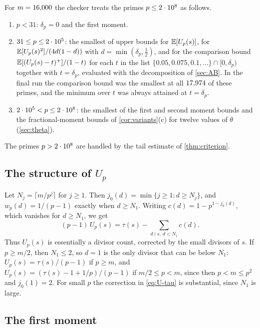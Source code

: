 For $m=16{,}000$ the checker  treats the primes $p\le2\cdot 10^{8}$ as follows.
\begin{enumerate}[label=(\alph*$'$)]
\item $p<31$: $\delta_p=0$ and the first moment.
\item $31\le p\le2\cdot 10^{5}$: the smallest of upper bounds for $\mathbb{E}[U_p(s)]$, for $\mathbb{E}[U_p(s)^2]/(4d(1-d))$ with
  $d=\min(\delta_p,\frac12)$, and for the comparison bound $\mathbb{E}[(U_p(s)-t)^+]/(1-t)$ for each $t$ in the list
  $\{0.05,0.075,0.1,\dots\}\cap[0,\delta_p)$ together with $t=\delta_p$, evaluated with the decomposition of
  \cref{sec:AB}. In the final run the comparison bound was the smallest at all $17{,}974$ of these primes, and the
  minimum over $t$ was always attained at $t=\delta_p$.
\item $2\cdot 10^{5}<p\le2\cdot 10^{8}$: the smallest of the first and second moment bounds and the fractional-moment bounds of
  \cref{cor:variants}(c) for twelve values of $\theta$ (\cref{sec:theta}).
\end{enumerate}
The primes $p>2\cdot 10^{8}$ are handled by the tail estimate of \cref{thm:criterion}.

\subsection{The structure of $U_p$}\label{sec:Ustructure}

Let $N_j=\lceil m/p^j\rceil$ for $j\ge1$. Then $j_0(d)=\min\{j\ge1:d\ge N_j\}$, and $w_p(d)=1/(p-1)$ exactly when
$d\ge N_1$. Writing $c(d)=1-p^{1-j_0(d)}$, which vanishes for $d\ge N_1$, we get
\begin{equation}\label{eq:U-tau}
  (p-1)\,U_p(s)=\tau(s)-\sum_{d\mid s,\ d<N_1}c(d).
\end{equation}
Thus $U_p(s)$ is essentially a divisor count, corrected by the small divisors of $s$. If $p\ge m/2$, then $N_1\le2$,
so $d=1$ is the only divisor that can be below $N_1$: $U_p(s)=\tau(s)/(p-1)$ if $p\ge m$, and
$U_p(s)=(\tau(s)-1+1/p)/(p-1)$ if $m/2\le p<m$, since then $p<m\le p^2$ and $j_0(1)=2$. For small $p$ the correction
in \eqref{eq:U-tau} is substantial, since $N_1$ is large.

\subsection{The first moment}\label{sec:eval-M1}


